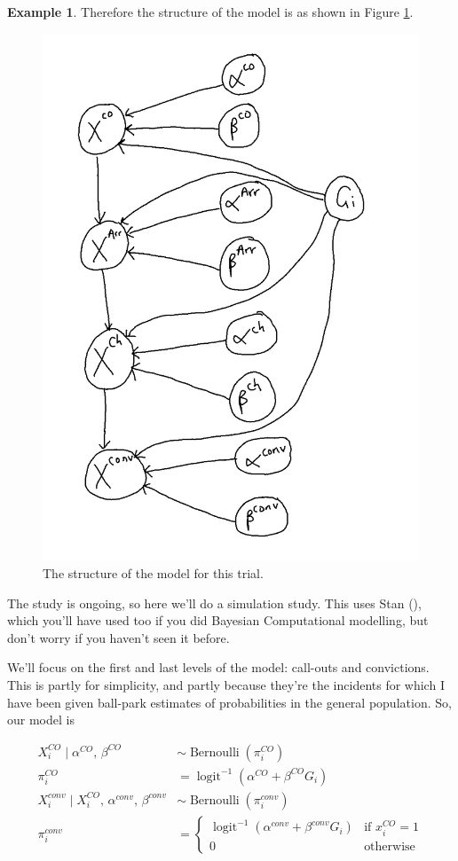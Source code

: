 \documentclass[
  openany]{book}
\theoremstyle{definition}
\theoremstyle{definition}
\newtheorem{example}{Example}[chapter]
\theoremstyle{definition}
\theoremstyle{definition}
\theoremstyle{remark}
\begin{document}
\begin{example}
Therefore the structure of the model is as shown in Figure \ref{fig:cop-model}.

\begin{figure}
\includegraphics[width=0.6\linewidth]{images/copmodel} \caption{The structure of the model for this trial.}\label{fig:cop-model}
\end{figure}

The study is ongoing, so here we'll do a simulation study. This uses Stan (\citet{rstan}), which you'll have used too if you did Bayesian Computational modelling, but don't worry if you haven't seen it before.

We'll focus on the first and last levels of the model: call-outs and convictions. This is partly for simplicity, and partly because they're the incidents for which I have been given ball-park estimates of probabilities in the general population. So, our model is

\begin{align*}
X_i^{CO}\mid \alpha^{CO},\,\beta^{CO} & \sim \operatorname{Bernoulli}\left(\pi_i^{CO}\right)\\
\pi^{CO}_i& = \operatorname{logit}^{-1}\left(\alpha^{CO} + \beta^{CO} G_i\right)\\
X_i^{conv}\mid X_i^{CO},\,\alpha^{conv}, \, \beta^{conv} & \sim \operatorname{Bernoulli}\left(\pi_i^{conv}\right)\\
\pi^{conv}_i& =
\begin{cases}
\operatorname{logit}^{-1}\left(\alpha^{conv} + \beta^{conv} G_i\right)&\text{if }x^{CO}_i=1\\
0 & \text{otherwise}
\end{cases}
\end{align*}


\end{example}
\end{document}
